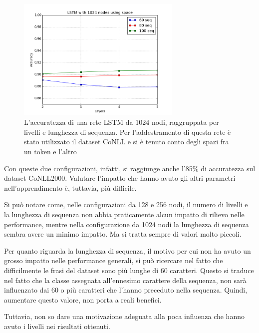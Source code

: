 \begin{figure}[H]
  \centering
  \begin{center}
    \includegraphics[width=0.7\textwidth]{./images/plots/english/accuracy_1024n_word_min_loss_using_spaces.png}
  \end{center}
  \caption{L'accuratezza di una rete LSTM da 1024 nodi, raggruppata per livelli e
          lunghezza di sequenza. Per l'addestramento di questa rete \`e stato
          utilizzato il dataset CoNLL e si \`e tenuto conto degli spazi fra un
          token e l'altro}
  \label{fig:accEng1024sp}
\end{figure}

Con queste due configurazioni, infatti, si raggiunge anche l'85\% di accuratezza
sul dataset CoNLL2000. Valutare l'impatto che hanno avuto gli altri parametri
nell'apprendimento \`e, tuttavia, pi\`u difficile.

Si pu\`o notare come, nelle configurazioni da 128 e 256 nodi, il numero di livelli
e la lunghezza di sequenza non abbia praticamente alcun impatto di rilievo nelle
performance, mentre nella configurazione da 1024 nodi la lunghezza di sequenza
sembra avere un minimo impatto. Ma si tratta sempre di valori molto piccoli.

Per quanto riguarda la lunghezza di sequenza, il motivo per cui non ha avuto un
grosso impatto nelle performance generali, si pu\`o ricercare nel fatto che
difficilmente le frasi del dataset sono pi\`u lunghe di 60 caratteri. Questo si
traduce nel fatto che la classe assegnata all'ennesimo carattere della sequenza,
non sar\`a influenzato dai 60 o pi\`u caratteri che l'hanno preceduto nella
sequenza. Quindi, aumentare questo valore, non porta a reali benefici.

Tuttavia, non so dare una motivazione adeguata alla poca influenza che hanno avuto
i livelli nei risultati ottenuti.


